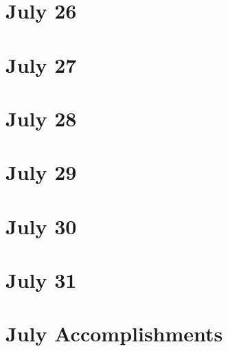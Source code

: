 \section{July 26}

\section{July 27}

\section{July 28}

\section{July 29}

\section{July 30}

\section{July 31}

\section{July Accomplishments}


                                                                                                                                   